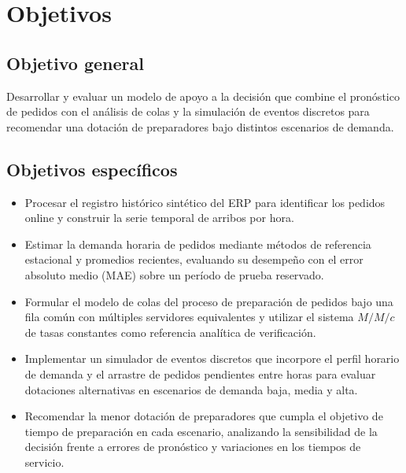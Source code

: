 \section{Objetivos}

\subsection{Objetivo general}
Desarrollar y evaluar un modelo de apoyo a la decisión que combine el pronóstico de pedidos con el análisis de colas y la simulación de eventos discretos para recomendar una dotación de preparadores bajo distintos escenarios de demanda.

\subsection{Objetivos específicos}
\begin{itemize}
\item Procesar el registro histórico sintético del ERP para identificar los pedidos online y construir la serie temporal de arribos por hora.
\item Estimar la demanda horaria de pedidos mediante métodos de referencia estacional y promedios recientes, evaluando su desempeño con el error absoluto medio (MAE) sobre un período de prueba reservado.
\item Formular el modelo de colas del proceso de preparación de pedidos bajo una fila común con múltiples servidores equivalentes y utilizar el sistema $M/M/c$ de tasas constantes como referencia analítica de verificación.
\item Implementar un simulador de eventos discretos que incorpore el perfil horario de demanda y el arrastre de pedidos pendientes entre horas para evaluar dotaciones alternativas en escenarios de demanda baja, media y alta.
\item Recomendar la menor dotación de preparadores que cumpla el objetivo de tiempo de preparación en cada escenario, analizando la sensibilidad de la decisión frente a errores de pronóstico y variaciones en los tiempos de servicio.
\end{itemize}
